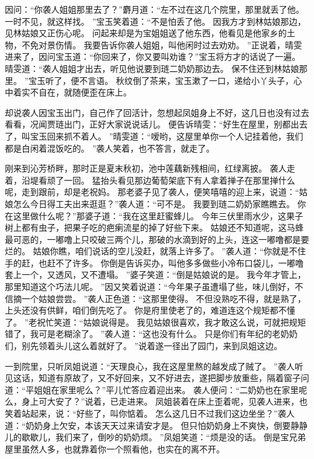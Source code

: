 因问：“你袭人姐姐那里去了？”麝月道：“左不过在这几个院里，那里就丢了他。
一时不见，就这样找。
”宝玉笑着道：“不是怕丢了他。
因我方才到林姑娘那边，见林姑娘又正伤心呢。
问起来却是为宝姐姐送了他东西，他看见是他家乡的土物，不免对景伤情。
我要告诉你袭人姐姐，叫他闲时过去劝劝。
”正说着，晴雯进来了，因问宝玉道：“你回来了，你又要叫劝谁？”宝玉将方才的话说了一遍。
晴雯道：“袭人姐姐才出去，听见他说要到琏二奶奶那边去。
保不住还到林姑娘那里。
”宝玉听了，便不言语。
秋纹倒了茶来，宝玉漱了一口，递给小丫头子，心中着实不自在，就随便歪在床上。
\par
却说袭人因宝玉出门，自己作了回活计，忽想起凤姐身上不好，这几日也没有过去看看，况闻贾琏出门，正好大家说说话儿。
便告诉晴雯：“好生在屋里，别都出去了，叫宝玉回来抓不着人。
”晴雯道：“嗳哟，这屋里单你一个人记挂着他，我们都是白闲着混饭吃的。
”袭人笑着，也不答言，就走了。
\par
刚来到沁芳桥畔，那时正是夏末秋初，池中莲藕新残相间，红绿离披。
袭人走着，沿堤看顽了一回。
猛抬头看见那边葡萄架底下有人拿着掸子在那里掸什么呢，走到跟前，却是老祝妈。
那老婆子见了袭人，便笑嘻嘻的迎上来，说道：“姑娘怎么今日得工夫出来逛逛？”袭人道：“可不是。
我要到琏二奶奶家瞧瞧去。
你在这里做什么呢？”那婆子道：“我在这里赶蜜蜂儿。
今年三伏里雨水少，这果子树上都有虫子，把果子吃的疤瘌流星的掉了好些下来。
姑娘还不知道呢，这马蜂最可恶的，一嘟噜上只咬破三两个儿，那破的水滴到好的上头，连这一嘟噜都是要烂的。
姑娘你瞧，咱们说话的空儿没赶，就落上许多了。
”袭人道：“你就是不住手的赶，也赶不了许多。
你倒是告诉买办，叫他多多做些小冷布口袋儿，一嘟噜套上一个，又透风，又不遭塌。
”婆子笑道：“倒是姑娘说的是。
我今年才管上，那里知道这个巧法儿呢。
”因又笑着说道：“今年果子虽遭塌了些，味儿倒好，不信摘一个姑娘尝尝。
”袭人正色道：“这那里使得。
不但没熟吃不得，就是熟了，上头还没有供鲜，咱们倒先吃了。
你是府里使老了的，难道连这个规矩都不懂了。
”老祝忙笑道：“姑娘说得是。
我见姑娘很喜欢，我才敢这么说，可就把规矩错了，我可是老糊涂了。
”袭人道：“这也没有什么。
只是你们有年纪的老奶奶们，别先领着头儿这么着就好了。
”说着遂一径出了园门，来到凤姐这边。
\par
一到院里，只听凤姐说道：“天理良心，我在这屋里熬的越发成了贼了。
”袭人听见这话，知道有原故了，又不好回来，又不好进去，遂把脚步放重些，隔着窗子问道：“平姐姐在家里呢么？”平儿忙答应着迎出来。
袭人便问：“二奶奶也在家里呢么，身上可大安了？”说着，已走进来。
凤姐装着在床上歪着呢，见袭人进来，也笑着站起来，说：“好些了，叫你惦着。
怎么这几日不过我们这边坐坐？”袭人道：“奶奶身上欠安，本该天天过来请安才是。
但只怕奶奶身上不爽快，倒要静静儿的歇歇儿，我们来了，倒吵的奶奶烦。
”凤姐笑道：“烦是没的话。
倒是宝兄弟屋里虽然人多，也就靠着你一个照看他，也实在的离不开。
